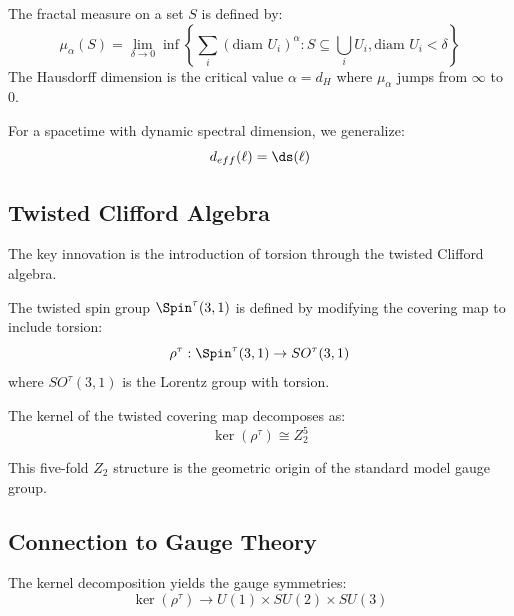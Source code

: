 \begin{definition}
The fractal measure on a set $S$ is defined by:
\begin{equation}
    \mu_\alpha(S) = \lim_{\delta \to 0} \inf \left\{\sum_i (\text{diam } U_i)^\alpha : S \subseteq \bigcup_i U_i, \text{diam } U_i < \delta\right\}
\end{equation}
The Hausdorff dimension is the critical value $\alpha = d_H$ where $\mu_\alpha$ jumps from $\infty$ to $0$.
\end{definition}

For a spacetime with dynamic spectral dimension, we generalize:
\begin{equation}
    d_{eff}(\ell) = \ds(\ell)
\end{equation}

\subsection{Twisted Clifford Algebra}

The key innovation is the introduction of torsion through the twisted Clifford algebra.

\begin{definition}
The twisted spin group $\Spin^\tau(3,1)$ is defined by modifying the covering map to include torsion:
\begin{equation}
    \rho^\tau: \Spin^\tau(3,1) \to SO^\tau(3,1)
\end{equation}
where $SO^\tau(3,1)$ is the Lorentz group with torsion.
\end{definition}

\begin{theorem}
The kernel of the twisted covering map decomposes as:
\begin{equation}
    \ker(\rho^\tau) \cong Z_2^5
\end{equation}
\end{theorem}

This five-fold $Z_2$ structure is the geometric origin of the standard model gauge group.

\subsection{Connection to Gauge Theory}

The kernel decomposition yields the gauge symmetries:
\begin{equation}
    \ker(\rho^\tau) \to U(1) \times SU(2) \times SU(3)
\end{equation}

